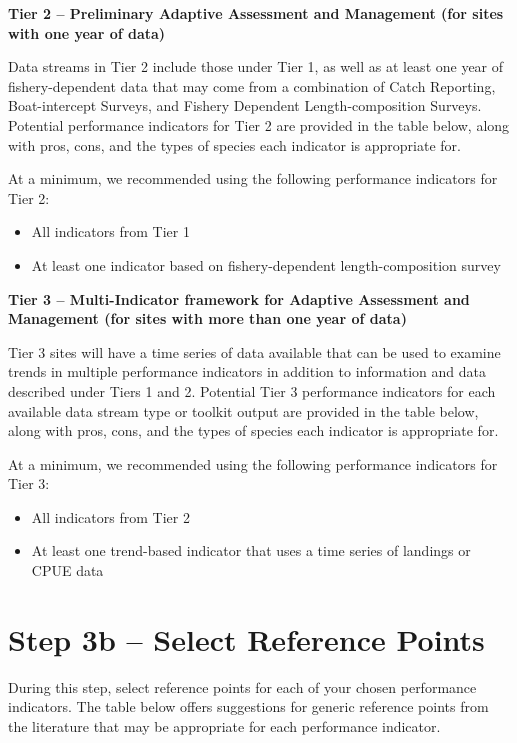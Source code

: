 \documentclass[]{book}
\begin{document}
\textbf{Tier 2 -- Preliminary Adaptive Assessment and Management (for
sites with one year of data)}

Data streams in Tier 2 include those under Tier 1, as well as at least
one year of fishery-dependent data that may come from a combination of
Catch Reporting, Boat-intercept Surveys, and Fishery Dependent
Length-composition Surveys. Potential performance indicators for Tier 2
are provided in the table below, along with pros, cons, and the types of
species each indicator is appropriate for.

At a minimum, we recommended using the following performance indicators
for Tier 2:

\begin{itemize}
\item
  All indicators from Tier 1
\item
  At least one indicator based on fishery-dependent length-composition
  survey
\end{itemize}

\textbf{Tier 3 -- Multi-Indicator framework for Adaptive Assessment and
Management (for sites with more than one year of data)}

Tier 3 sites will have a time series of data available that can be used
to examine trends in multiple performance indicators in addition to
information and data described under Tiers 1 and 2. Potential Tier 3
performance indicators for each available data stream type or toolkit
output are provided in the table below, along with pros, cons, and the
types of species each indicator is appropriate for.

At a minimum, we recommended using the following performance indicators
for Tier 3:

\begin{itemize}
\item
  All indicators from Tier 2
\item
  At least one trend-based indicator that uses a time series of landings
  or CPUE data
\end{itemize}

\section{Step 3b -- Select Reference
Points}\label{step-3b-select-reference-points}

During this step, select reference points for each of your chosen
performance indicators. The table below offers suggestions for generic
reference points from the literature that may be appropriate for each
performance indicator.
\end{document}
